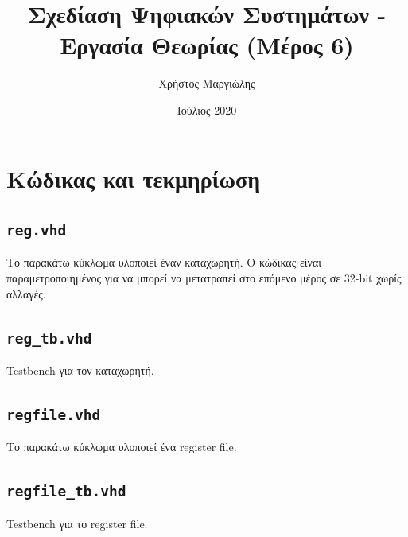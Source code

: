 \documentclass{article}
\title{Σχεδίαση Ψηφιακών Συστημάτων - Εργασία Θεωρίας (Μέρος 6)}
\author{Χρήστος Μαργιώλης}
\date{Ιούλιος 2020}
\begin{document}
\begin{titlepage}
        \maketitle
\end{titlepage}

\renewcommand{\contentsname}{Περιεχόμενα}
\tableofcontents

\section{Κώδικας και τεκμηρίωση}

\subsection{\lstinline{reg.vhd}}

Το παρακάτω κύκλωμα υλοποιεί έναν καταχωρητή. Ο κώδικας είναι παραμετροποιημένος
για να μπορεί να μετατραπεί στο επόμενο μέρος σε 32-bit χωρίς αλλαγές. \\


\pagebreak

\subsection{\lstinline{reg_tb.vhd}}

Testbench για τον καταχωρητή. \\


\pagebreak

\subsection{\lstinline{regfile.vhd}}

Το παρακάτω κύκλωμα υλοποιεί ένα register file. \\


\pagebreak

\subsection{\lstinline{regfile_tb.vhd}}

Testbench για το register file. \\


\pagebreak
\end{document}
